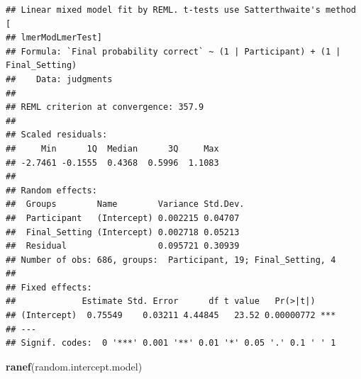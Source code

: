 \documentclass[
]{article}
\newenvironment{Shaded}{\begin{snugshade}}{\end{snugshade}}
\newcommand{\AttributeTok}[1]{\textcolor[rgb]{0.13,0.29,0.53}{#1}}
\newcommand{\ConstantTok}[1]{\textcolor[rgb]{0.56,0.35,0.01}{#1}}
\newcommand{\DecValTok}[1]{\textcolor[rgb]{0.00,0.00,0.81}{#1}}
\newcommand{\FunctionTok}[1]{\textcolor[rgb]{0.13,0.29,0.53}{\textbf{#1}}}
\newcommand{\NormalTok}[1]{#1}
\newcommand{\OtherTok}[1]{\textcolor[rgb]{0.56,0.35,0.01}{#1}}
\newcommand{\SpecialCharTok}[1]{\textcolor[rgb]{0.81,0.36,0.00}{\textbf{#1}}}
\newcommand{\StringTok}[1]{\textcolor[rgb]{0.31,0.60,0.02}{#1}}
\begin{document}
\begin{Shaded}
\end{Shaded}

\begin{verbatim}
## Linear mixed model fit by REML. t-tests use Satterthwaite's method [
## lmerModLmerTest]
## Formula: `Final probability correct` ~ (1 | Participant) + (1 | Final_Setting)
##    Data: judgments
## 
## REML criterion at convergence: 357.9
## 
## Scaled residuals: 
##     Min      1Q  Median      3Q     Max 
## -2.7461 -0.1555  0.4368  0.5996  1.1083 
## 
## Random effects:
##  Groups        Name        Variance Std.Dev.
##  Participant   (Intercept) 0.002215 0.04707 
##  Final_Setting (Intercept) 0.002718 0.05213 
##  Residual                  0.095721 0.30939 
## Number of obs: 686, groups:  Participant, 19; Final_Setting, 4
## 
## Fixed effects:
##             Estimate Std. Error      df t value   Pr(>|t|)    
## (Intercept)  0.75549    0.03211 4.44845   23.52 0.00000772 ***
## ---
## Signif. codes:  0 '***' 0.001 '**' 0.01 '*' 0.05 '.' 0.1 ' ' 1
\end{verbatim}

\begin{Shaded}
\begin{Highlighting}[]
\FunctionTok{ranef}\NormalTok{(random.intercept.model)}
\end{Highlighting}
\end{Shaded}
\end{document}
